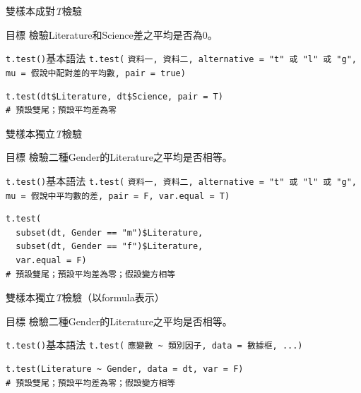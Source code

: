 \documentclass[12pt]{beamer}
\begin{document}
\begin{frame}[fragile]{雙樣本成對\emph{T}檢驗}
\begin{block}{目標}
檢驗Literature和Science差之平均是否為0。
\end{block}
\begin{block}{\texttt{t.test()}基本語法}
\verb+t.test(+
\verb+資料一, 資料二, alternative = "t" 或 "l" 或 "g",+
\verb+mu = 假說中配對差的平均數, pair = true)+
\end{block}
\begin{verbatim}
t.test(dt$Literature, dt$Science, pair = T)
# 預設雙尾；預設平均差為零
\end{verbatim}
\end{frame}


\begin{frame}[fragile]{雙樣本獨立\emph{T}檢驗}
\begin{block}{目標}
檢驗二種Gender的Literature之平均是否相等。
\end{block}
\begin{block}{\texttt{t.test()}基本語法}
\verb+t.test(+
\verb+資料一, 資料二, alternative = "t" 或 "l" 或 "g",+
\verb+mu = 假說中平均數的差, pair = F, var.equal = T)+
\end{block}
\begin{verbatim}
t.test(
  subset(dt, Gender == "m")$Literature,
  subset(dt, Gender == "f")$Literature,
  var.equal = F)
# 預設雙尾；預設平均差為零；假設變方相等
\end{verbatim}
\end{frame}

\begin{frame}[fragile]{雙樣本獨立\emph{T}檢驗（以formula表示）}
\begin{block}{目標}
檢驗二種Gender的Literature之平均是否相等。
\end{block}
\begin{block}{\texttt{t.test()}基本語法}
\verb+t.test(+
\verb+應變數 ~ 類別因子, data = 數據框, ...)+
\end{block}
\begin{verbatim}
t.test(Literature ~ Gender, data = dt, var = F)
# 預設雙尾；預設平均差為零；假設變方相等
\end{verbatim}
\end{frame}
\end{document}
